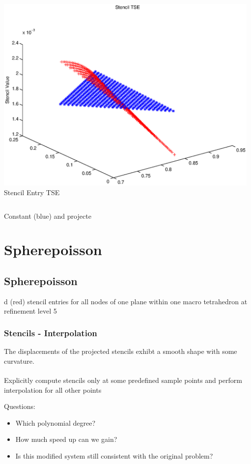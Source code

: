 \documentclass[t,compress=false,usepdftitle=false]{beamer}
\begin{document}
\begin{frame}
\begin{columns}[T]
\begin{column}[T]{4.1cm}
  \includegraphics[width=0.98\textwidth]{stencilTSE_nE}\\
  Stencil Entry TSE
\end{column}
\end{columns}
\vspace{0.5cm}
\centering
Constant (blue) and projecte%
%
\section{Spherepoisson}
\subsection{Spherepoisson}d (red) stencil entries for all nodes of one plane
within one macro tetrahedron at refinement level 5


\end{frame}

%
%
\begin{frame}\frametitle{Stencils - Interpolation}


 The displacements of the projected stencils exhibt
a smooth shape with some curvature.\\
\vspace{4ex}
\\
\vspace{4ex} 
 Explicitly compute stencils only at some predefined sample
points and perform interpolation for all other points 

Questions: 
\begin{itemize}
\item{Which polynomial degree?}
\item{How much speed up can we gain?}
\item{Is this modified system still consistent with the original problem? }
\end{itemize}



\end{frame}
\end{document}
